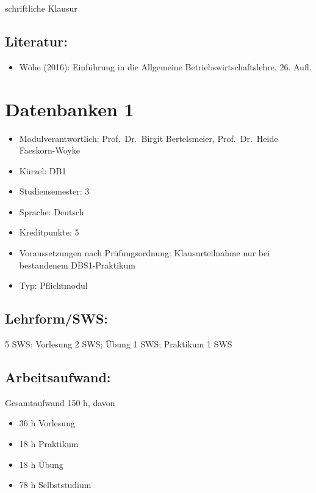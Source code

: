 schriftliche Klausur

\section*{Literatur:}\label{literatur-4}

\begin{itemize}
\tightlist
\item
  Wöhe (2016): Einführung in die Allgemeine Betriebswirtschaftslehre,
  26. Aufl.
\end{itemize}

\chapter{Datenbanken 1}\label{datenbanken-1}

\begin{itemize}
\tightlist
\item
  Modulverantwortlich: Prof.~Dr.~Birgit Bertelsmeier, Prof.~Dr.~Heide
  Faeskorn-Woyke
\item
  Kürzel: DB1
\item
  Studiensemester: 3
\item
  Sprache: Deutsch
\item
  Kreditpunkte: 5
\item
  Voraussetzungen nach Prüfungsordnung: Klausurteilnahme nur bei
  bestandenem DBS1-Praktikum
\item
  Typ: Pflichtmodul
\end{itemize}

\section*{Lehrform/SWS:}\label{lehrformsws-7}

5 SWS: Vorlesung 2 SWS; Übung 1 SWS; Praktikum 1 SWS

\section*{Arbeitsaufwand:}\label{arbeitsaufwand-7}

Gesamtaufwand 150 h, davon

\begin{itemize}
\tightlist
\item
  36 h Vorlesung
\item
  18 h Praktikum
\item
  18 h Übung
\item
  78 h Selbststudium
\end{itemize}

